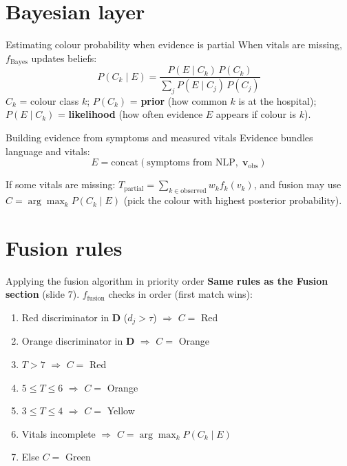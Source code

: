 \documentclass[aspectratio=169,11pt]{beamer}
\newcommand{\bcol}[2][blue!70!black]{\textcolor{#1}{#2}}
\begin{document}
\section{Bayesian layer}

\begin{frame}{Estimating colour probability when evidence is partial}
	When vitals are missing, $f_{\text{Bayes}}$ updates beliefs:
	\[
	P(C_k \mid E) = \frac{P(E \mid C_k)\, P(C_k)}{\sum_j P(E \mid C_j)\, P(C_j)}
	\]
	$C_k$ = colour class $k$; $P(C_k)$ = \textbf{prior} (how common $k$ is at the hospital); $P(E \mid C_k)$ = \textbf{likelihood} (how often evidence $E$ appears if colour is $k$).
\end{frame}

\begin{frame}{Building evidence from symptoms and measured vitals}
	Evidence bundles language and vitals:
	\[
	E = \mathrm{concat}(\text{symptoms from NLP},\; \mathbf{v}_{\text{obs}})
	\]

	If some vitals are missing: $T_{\text{partial}} = \sum_{k \in \text{observed}} w_k f_k(v_k)$, and fusion may use $C = \arg\max_k P(C_k \mid E)$ (pick the colour with highest posterior probability).
\end{frame}

\section{Fusion rules}

\begin{frame}{Applying the fusion algorithm in priority order}
	\textbf{Same rules as the Fusion section} (slide 7). $f_{\text{fusion}}$ checks in order (first match wins):
	\small
	\begin{enumerate}
		\item Red discriminator in $\mathbf{D}$ ($d_j > \tau$) $\Rightarrow$ $C =$ \bcol[triageRed]{Red}
		\item Orange discriminator in $\mathbf{D}$ $\Rightarrow$ $C =$ \bcol[triageOrange]{Orange}
		\item $T > 7$ $\Rightarrow$ $C =$ \bcol[triageRed]{Red}
		\item $5 \leq T \leq 6$ $\Rightarrow$ $C =$ \bcol[triageOrange]{Orange}
		\item $3 \leq T \leq 4$ $\Rightarrow$ $C =$ \bcol[triageYellow]{Yellow}
		\item Vitals incomplete $\Rightarrow$ $C = \arg\max_k P(C_k \mid E)$
		\item Else $C =$ \bcol[triageGreen]{Green}
	\end{enumerate}
\end{frame}
\end{document}
